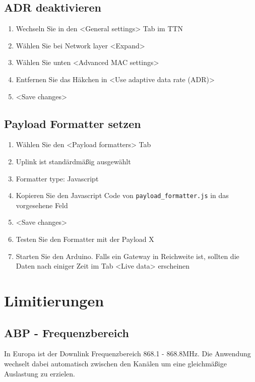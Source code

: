 \documentclass[12pt]{article}
\begin{document}
    \subsection{ADR deaktivieren} \label{subsec:ADR deaktivieren}
      \begin{enumerate}
        \item Wechseln Sie in den \textless General settings\textgreater{} Tab im TTN
        \item Wählen Sie bei Network layer \textless Expand\textgreater{}
        \item Wählen Sie unten \textless Advanced MAC settings\textgreater{}
        \item Entfernen Sie das Häkchen in \textless Use adaptive data rate (ADR)\textgreater{}
        \item \textless Save changes\textgreater{}
      \end{enumerate}


    
    \subsection{Payload Formatter setzen} \label{subsec:Payload Formatter setzen}
    \begin{enumerate}
      \item Wählen Sie den \textless Payload formatters\textgreater{} Tab
      \item Uplink ist standärdmäßig ausgewählt
      \item Formatter type: Javascript
      \item Kopieren Sie den Javascript Code von \texttt{payload\_formatter.js} in das vorgesehene Feld
      \item \textless Save changes\textgreater{}
      \item Testen Sie den Formatter mit der Payload X %
      \item Starten Sie den Arduino. Falls ein Gateway in Reichweite ist, sollten die Daten nach einiger
        Zeit im Tab \textless Live data\textgreater{} erscheinen
    \end{enumerate}

  \section{Limitierungen}

      \subsection{ABP - Frequenzbereich} \label{subsec:ABP - Frequenzbereich}
        In Europa ist der Downlink Frequenzbereich 868.1 - 868.8MHz.
        Die Anwendung wechselt dabei automatisch zwischen den Kanälen um eine gleichmäßige Auslastung zu erzielen.
\end{document}
